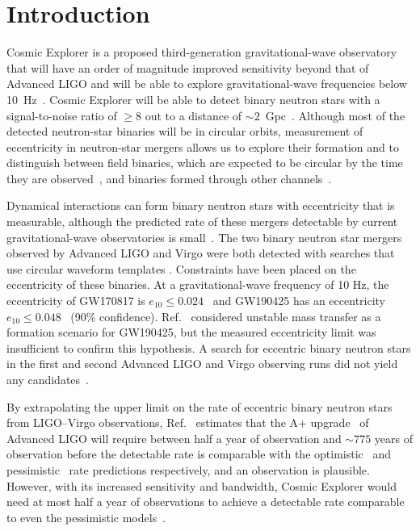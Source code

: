 \section{\label{sec:3G-Intro}Introduction}

Cosmic Explorer is a proposed third-generation gravitational-wave observatory that will have an order of magnitude improved sensitivity beyond that of Advanced LIGO and will be able to explore gravitational-wave frequencies below 10~Hz~\cite{Reitze:2019iox}. Cosmic Explorer will be able to detect binary neutron stars with a signal-to-noise ratio of $\ge 8$ out to a distance of $\sim 2$~Gpc~\cite{Chen:2017wpg}. Although most of the detected neutron-star binaries will be in circular orbits, measurement of eccentricity in neutron-star mergers allows us to explore their formation and to distinguish between field binaries, which are expected to be circular by the time they are observed~\cite{Peters:1964}, and binaries formed through other channels~\cite{Smarr1976,Canal:1990dz,PortegiesZwart1:1997zn,Postnov:2006hka,Kalogera:2006uj,Kowalska:2010qg,Beniamini:2015uta,Tauris:2017omb,Palmese:2017yhz,Belczynski:2018ptv,Vigna-Gomez:2018dza,Giacobbo:2018etu,Mapelli:2018wys,Andrews:2019vou}.

Dynamical interactions can form binary neutron stars with eccentricity that is measurable, although the predicted rate of these mergers detectable by current gravitational-wave observatories is small~\cite{Lee:2009ca,Ye:2019xvf}. The two binary neutron star mergers observed by Advanced LIGO and Virgo \cite{TheLIGOScientific:2017qsa,Abbott:2020uma} were both detected with searches that use circular waveform templates \cite{Allen:2004gu,Allen:2005fk,Canton:2014ena,Usman:2015kfa,Nitz:2017svb,Sachdev:2019vvd,Cannon:2020qnf,Davies:2020tsx, DalCanton:2020vpm}. Constraints have been placed on the eccentricity of these binaries. At a gravitational-wave frequency of 10 Hz, the eccentricity of GW170817 is $e_{10} \leq 0.024$~\cite{Lenon:2020oza} and GW190425 has an eccentricity $e_{10} \leq 0.048$~\cite{Romero-Shaw:2019itr, Lenon:2020oza} (90\% confidence). Ref.~\cite{Romero-Shaw:2019itr} considered unstable mass transfer as a formation scenario for GW190425, but the measured eccentricity limit was insufficient to confirm this hypothesis. A search for eccentric binary neutron stars in the first and second Advanced LIGO and Virgo observing runs did not yield any candidates~\cite{Nitz:2019spj}.

By extrapolating the upper limit on the rate of eccentric binary neutron stars from LIGO--Virgo observations, Ref.~\cite{Nitz:2019spj} estimates that the A+ upgrade~\cite{Aasi:2013wya} of Advanced LIGO will require between half a year of observation and $\sim 775$ years of observation before the detectable rate is comparable with the optimistic~\cite{Lee:2009ca} and pessimistic~\cite{Ye:2019xvf} rate predictions respectively, and an observation is plausible.  However, with its increased sensitivity and bandwidth, Cosmic Explorer would need at most half a year of observations to achieve a detectable rate comparable to even the pessimistic models~\cite{Nitz:2019spj}.

